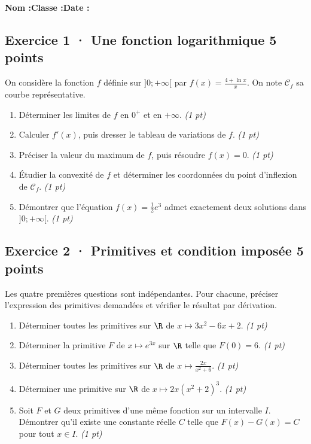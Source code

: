 \smallskip\textbf{Nom :}\enspace\dotfill\quad\textbf{Classe :}\enspace\dotfill\quad\textbf{Date :}\enspace\dotfill

\subsection*{Exercice 1 · Une fonction logarithmique \hfill 5 points}On considère la fonction $f$ définie sur $]0;+\infty[$ par $f(x)=\frac{4+\ln x}x$. On note $\mathcal C_f$ sa courbe représentative.

\begin{enumerate}

\item Déterminer les limites de $f$ en $0^+$ et en $+\infty$. \hfill\textit{(1 pt)}

\item Calculer $f' (x)$, puis dresser le tableau de variations de $f$. \hfill\textit{(1 pt)}

\item Préciser la valeur du maximum de $f$, puis résoudre $f(x)=0$. \hfill\textit{(1 pt)}

\item Étudier la convexité de $f$ et déterminer les coordonnées du point d'inflexion de $\mathcal C_f$. \hfill\textit{(1 pt)}

\item Démontrer que l'équation $f(x)=\frac12 e^{3}$ admet exactement deux solutions dans $]0;+\infty[$. \hfill\textit{(1 pt)}

\end{enumerate}

\subsection*{Exercice 2 · Primitives et condition imposée \hfill 5 points}Les quatre premières questions sont indépendantes. Pour chacune, préciser l'expression des primitives demandées et vérifier le résultat par dérivation.

\begin{enumerate}

\item Déterminer toutes les primitives sur $\R$ de $x\mapsto 3x^2-6x+2$. \hfill\textit{(1 pt)}

\item Déterminer la primitive $F$ de $x\mapsto e^{3x}$ sur $\R$ telle que $F(0)=6$. \hfill\textit{(1 pt)}

\item Déterminer toutes les primitives sur $\R$ de $x\mapsto\frac{2x}{x^2+6}$. \hfill\textit{(1 pt)}

\item Déterminer une primitive sur $\R$ de $x\mapsto2x(x^2+2)^{3}$. \hfill\textit{(1 pt)}

\item Soit $F$ et $G$ deux primitives d'une même fonction sur un intervalle $I$. Démontrer qu'il existe une constante réelle $C$ telle que $F(x)-G(x)=C$ pour tout $x\in I$. \hfill\textit{(1 pt)}

\end{enumerate}

